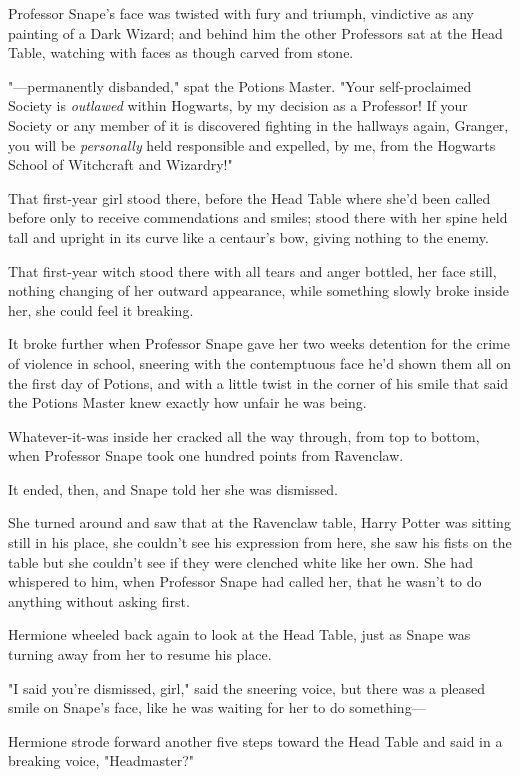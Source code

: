 Professor Snape's face was twisted with fury and triumph, vindictive as any 
painting of a Dark Wizard; and behind him the other Professors sat at the Head 
Table, watching with faces as though carved from stone.

"---permanently disbanded," spat the Potions Master. "Your self-proclaimed 
Society is \emph{outlawed} within Hogwarts, by my decision as a Professor! If 
your Society or any member of it is discovered fighting in the hallways again, 
Granger, you will be \emph{personally} held responsible and expelled, by me, 
from the Hogwarts School of Witchcraft and Wizardry!"

That first-year girl stood there, before the Head Table where she'd been called 
before only to receive commendations and smiles; stood there with her spine 
held tall and upright in its curve like a centaur's bow, giving nothing to the 
enemy.

That first-year witch stood there with all tears and anger bottled, her face 
still, nothing changing of her outward appearance, while something slowly broke 
inside her, she could feel it breaking.

It broke further when Professor Snape gave her two weeks detention for the 
crime of violence in school, sneering with the contemptuous face he'd shown 
them all on the first day of Potions, and with a little twist in the corner of 
his smile that said the Potions Master knew exactly how unfair he was being.

Whatever-it-was inside her cracked all the way through, from top to bottom, 
when Professor Snape took one hundred points from Ravenclaw.

It ended, then, and Snape told her she was dismissed.

She turned around and saw that at the Ravenclaw table, Harry Potter was sitting 
still in his place, she couldn't see his expression from here, she saw his 
fists on the table but she couldn't see if they were clenched white like her 
own. She had whispered to him, when Professor Snape had called her, that he 
wasn't to do anything without asking first.

Hermione wheeled back again to look at the Head Table, just as Snape was 
turning away from her to resume his place.

"I said you're dismissed, girl," said the sneering voice, but there was a 
pleased smile on Snape's face, like he was waiting for her to do something---

Hermione strode forward another five steps toward the Head Table and said in a 
breaking voice, "Headmaster?"

